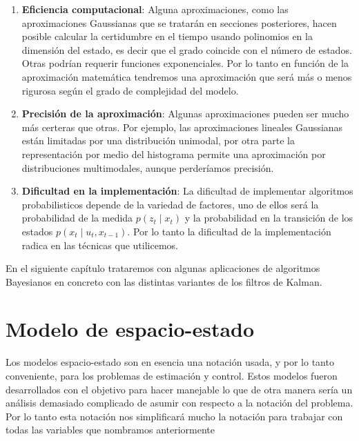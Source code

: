 \begin{enumerate}
	\item \textbf{Eficiencia computacional}: Alguna aproximaciones, como las aproximaciones Gaussianas que se tratarán en secciones posteriores, hacen posible calcular la certidumbre en el tiempo usando polinomios en la dimensión del estado, es decir que el grado coincide con el número de estados. Otras podrían requerir funciones exponenciales. Por lo tanto en función de la aproximación matemática tendremos una aproximación que será más o menos rigurosa según el grado de complejidad del modelo.
%
%
%
%
%
%
    \item \textbf{Precisión de la aproximación}: Algunas aproximaciones pueden ser mucho más certeras que otras. Por ejemplo, las aproximaciones lineales Gaussianas están limitadas por una distribución unimodal, por otra parte la representación por medio del histograma permite una aproximación por distribuciones multimodales, aunque perderíamos precisión.
    \item \textbf{Dificultad en la implementación}: La dificultad de implementar algoritmos probabilisticos depende de la variedad de factores, uno de ellos será la probabilidad de la medida $p( z_{t} \mid x_{t})$ y la probabilidad en la transición de los estados $p(x_{t} \mid u_{t},x_{t-1})$. 
    Por lo tanto la dificultad de la implementación radica en las técnicas que utilicemos.
\end{enumerate}
En el siguiente capítulo trataremos con algunas aplicaciones de algoritmos Bayesianos en concreto con las distintas variantes de los filtros de Kalman.

\section{Modelo de espacio-estado}
Los modelos espacio-estado son en esencia una notación usada, y por lo tanto conveniente, para los problemas de estimación y control. 
Estos modelos fueron desarrollados con el objetivo para hacer manejable lo que de otra manera sería un análisis demasiado complicado de asumir con respecto a la notación del problema. Por lo tanto esta notación nos simplificará mucho la notación para trabajar con todas las variables que nombramos anteriormente 

